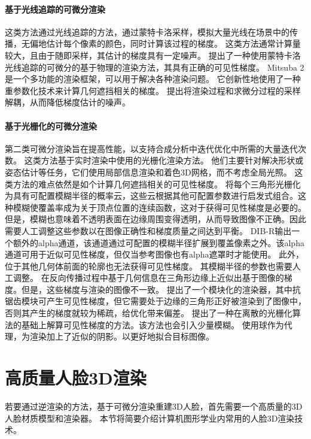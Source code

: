 \paragraph{基于光线追踪的可微分渲染}
这类方法通过光线追踪的方法，通过蒙特卡洛采样，模拟大量光线在场景中的传播，无偏地估计每个像素的颜色，同时计算该过程的梯度。
这类方法通常计算量较大，且由于随即采样，其估计的梯度具有一定噪声。
\citet{redner}提出了一种使用蒙特卡洛光线追踪的可微分的基于物理的渲染方法，其具有正确的可见性梯度。
Mitsuba 2\citep{Mitsuba2}是一个多功能的渲染框架，可以用于解决各种渲染问题。
它创新性地使用了一种重参数化技术来计算几何遮挡相关的梯度。
\citet{ZeltnerSGJ21}提出将渲染过程和求微分过程的采样解耦，从而降低梯度估计的噪声。

\paragraph{基于光栅化的可微分渲染}
第二类可微分渲染旨在提高性能，以支持合成分析中迭代优化中所需的大量迭代次数。
这类方法基于实时渲染中使用的光栅化渲染方法。
他们主要针对解决形状或姿态估计等任务，它们使用局部信息渲染和着色3D网格，而不考虑全局光照。
这类方法的难点依然是如个计算几何遮挡相关的可见性梯度。
\citet{softras}将每个三角形光栅化为具有可配置模糊半径的概率云，这些云根据其他可配置参数进行启发式组合。这种模糊使覆盖率成为关于顶点位置的连续函数，这对于获得可见性梯度是必要的。
但是，模糊也意味着不透明表面在边缘周围变得透明，从而导致图像不正确。因此需要人工调整这些参数以在图像正确性和梯度质量之间达到平衡。
DIB-R\citep{ChenLGSLJF19}输出一个额外的alpha通道，该通道通过可配置的模糊半径扩展到覆盖像素之外。该alpha通道可用于近似可见性梯度，但仅当参考图像也有alpha遮罩时才能使用。
此外，位于其他几何体前面的轮廓也无法获得可见性梯度。
其模糊半径的参数也需要人工调整。
\citet{KatoUH18}在反向传播过程中基于几何信息在三角形边缘上近似出基于图像的梯度。但是，这些梯度与渲染的图像不一致。
\citet{nvdiffrast}提出了一个模块化的渲染器，其中抗锯齿模块可产生可见性梯度，但它需要处于边缘的三角形正好被渲染到了图像中，否则其产生的梯度就较为稀疏，给优化带来偏差。
\citet{ColeGSVZ21}提出了一种在离散的光栅化算法的基础上解算可见性梯度的方法。该方法也会引入少量模糊。
\citet{LyuHL0TT21}使用球作为代理，为渲染加上了近似的阴影。以更好地拟合目标图像。

\section{高质量人脸3D渲染}

若要通过逆渲染的方法，基于可微分渲染重建3D人脸，首先需要一个高质量的3D人脸材质模型和渲染器。
本节将简要介绍计算机图形学业内常用的人脸3D渲染技术。


